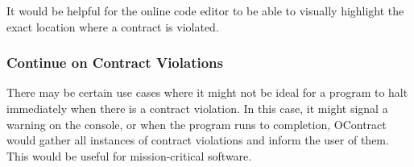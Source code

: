 \documentclass[a4paper]{article}
\begin{document}
It would be helpful for the online code editor to be able to visually highlight the exact location
where a contract is violated.

\subsubsection{Continue on Contract Violations}

There may be certain use cases where it might not be ideal for a program to halt immediately
when there is a contract violation. In this case, it might signal a warning on the console,
or when the program runs to completion, OContract would gather all instances of contract violations
and inform the user of them. This would be useful for mission-critical software.



\end{document}
